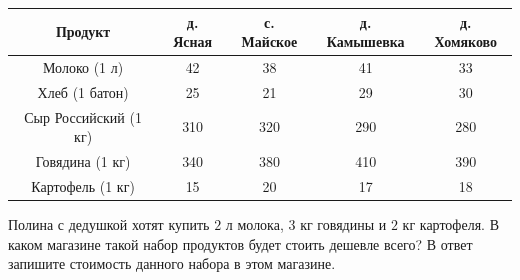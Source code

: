 \begin{class}[number=1]
\begin{listofex}
		\begin{center}
			\footnotesize
			\begin{tabular}{|c|c|c|c|c|}
				\hline
				\rowcolor{gray}\textbf{Продукт}&\textbf{д. Ясная}&\textbf{с. Майское}&\textbf{д. Камышевка}&\textbf{д. Хомяково}\\
				\hline
				Молоко (1 л)&42&38&41&33\\
				\hline
				Хлеб (1 батон)&25&21&29&30\\
				\hline
				Сыр Российский (1 кг)&310&320&290&280\\
				\hline
				Говядина (1 кг)&340&380&410&390\\
				\hline
				Картофель (1 кг)&15&20&17&18\\
				\hline
			\end{tabular}
		\end{center}
		Полина с дедушкой хотят купить \( 2 \) л молока, \( 3 \) кг говядины и \( 2 \) кг картофеля. В каком магазине такой набор продуктов будет стоить дешевле всего? В ответ запишите стоимость данного набора в этом магазине.
		\item {}
		\item {}
		\item {}
	\end{listofex}
\end{class}
%
%
